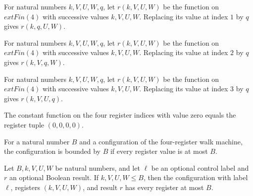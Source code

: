 \begin{lemma}
\label{BoolCircuit.AdjWalk.upd_1}
\leanok
{}
For natural numbers $k,V,U,W,q$, let $r(k,V,U,W)$ be the function on $	ext{Fin}(4)$ with
successive values $k,V,U,W$. Replacing its value at index $1$ by $q$ gives $r(k,q,U,W)$.
\end{lemma}

\begin{lemma}
\label{BoolCircuit.AdjWalk.upd_2}
\leanok
{}
For natural numbers $k,V,U,W,q$, let $r(k,V,U,W)$ be the function on $	ext{Fin}(4)$ with
successive values $k,V,U,W$. Replacing its value at index $2$ by $q$ gives $r(k,V,q,W)$.
\end{lemma}

\begin{lemma}
\label{BoolCircuit.AdjWalk.upd_3}
\leanok
{}
For natural numbers $k,V,U,W,q$, let $r(k,V,U,W)$ be the function on $	ext{Fin}(4)$ with
successive values $k,V,U,W$. Replacing its value at index $3$ by $q$ gives $r(k,V,U,q)$.
\end{lemma}

\begin{lemma}
\label{BoolCircuit.AdjWalk.rg_init}
\leanok
{}
The constant function on the four register indices with value zero equals the register
tuple $(0,0,0,0)$.
\end{lemma}

\begin{definition}
\label{BoolCircuit.AdjWalk.Gd}
\leanok
{}
For a natural number $B$ and a configuration of the four-register walk machine, the
configuration is bounded by $B$ if every register value is at most $B$.
\end{definition}

\begin{lemma}
\label{BoolCircuit.AdjWalk.gd_rg}
\leanok
{}
Let $B,k,V,U,W$ be natural numbers, and let $\ell$ be an optional control label and $r$
an optional Boolean result. If $k,V,U,W\le B$, then the configuration with label $\ell$,
registers $(k,V,U,W)$, and result $r$ has every register at most $B$.
\end{lemma}

